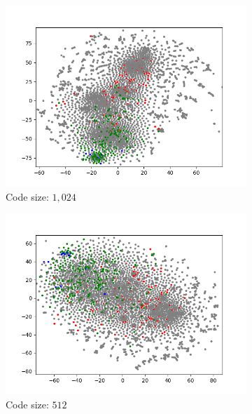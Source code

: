 \begin{figure}[H]
\begin{subfigure}{.25\textwidth}
        \includegraphics[width=\textwidth]{images/figures/experiments_latent/convolutional_dim1024_classes.png}
        \caption{Code size: $1,024$}
    \end{subfigure}%
    \begin{subfigure}{.25\textwidth}
        \centering
        \includegraphics[width=\textwidth]{images/figures/experiments_latent/convolutional_dim512_classes.png}
        \caption{Code size: $512$}
    \end{subfigure}%
    \begin{subfigure}{.25\textwidth}
        \centering

\end{subfigure}
\end{figure}
